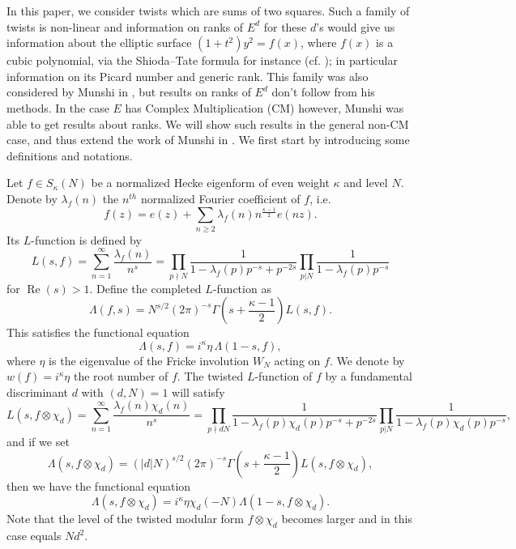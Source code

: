 \documentclass[12pt]{amsart}
\def\Re{\operatorname{Re}}
\begin{document}
In this paper, we consider twists which are sums of two squares. Such a family of twists is non-linear and information on ranks of $E^d$ for these $d$'s would give us information about the elliptic surface $(1+t^2)y^2=f(x)$, where $f(x)$ is a cubic polynomial, via the Shioda--Tate formula for instance (cf. \cite{shioda}); in particular information on its Picard number and generic rank. This family was also considered by Munshi in \cite{Munshi1}, but results on ranks of $E^d$ don't follow from his methods. In the case $E$ has Complex Multiplication (CM) however, Munshi \cite{Munshi2} was able to get results about ranks. We will show such results in the general non-CM case, and thus extend the work of Munshi in \cite{Munshi1}. We first start by introducing some definitions and notations.

Let $f \in S_{\kappa}(N) $ be a normalized Hecke eigenform of even weight $\kappa$ and level $N$. Denote by $\lambda_f(n)$ the $n^{th}$ normalized Fourier coefficient of $f$, i.e. $$f(z)=e(z)+\sum_{n\geq 2}\lambda_f(n)n^{\frac{\kappa-1}{2}}e(nz).$$ Its $L$-function is defined by
\[L(s,f)=\sum_{n=1}^{\infty}\frac{\lambda_f(n)}{n^s}=\prod_{p\nmid N}\frac{1}{1-\lambda_f(p)p^{-s}+p^{-2s}}\prod_{p|N}\frac{1}{1-\lambda_f(p)p^{-s}}\]
for $\Re(s)>1$.
Define the completed $L$-function as
\[\Lambda(f,s)=N^{s/2}(2\pi)^{-s}\Gamma\left(s+\frac{\kappa-1}{2}\right)L(s,f).\]
This satisfies the functional equation
\[\Lambda(s,f)=i^{\kappa}\eta\,\Lambda(1-s,f),\]
where $\eta$ is the eigenvalue of the Fricke involution $W_N$ acting on $f$. We denote by $w(f)=i^{\kappa}\eta$ the root number of $f$.
The twisted $L$-function of $f$ by a fundamental discriminant $d$ with $(d,N)=1$ will satisfy
\[L(s,f\otimes\chi_d)=\sum_{n=1}^{\infty}\frac{\lambda_f(n)\chi_d(n)}{n^s}=\prod_{p\nmid dN}\frac{1}{1-\lambda_f(p)\chi_d(p)p^{-s}+p^{-2s}}\prod_{p|N}\frac{1}{1-\lambda_f(p)\chi_d(p)p^{-s}},\]
and if we set 
\[\Lambda(s,f\otimes\chi_d)=(|d|N)^{s/2}(2\pi)^{-s}\Gamma\left(s+\frac{\kappa-1}{2}\right)L(s,f\otimes \chi_d),\]
then we have the functional equation
\[\Lambda(s,f\otimes\chi_d)=i^{\kappa}\eta \chi_d(-N)\Lambda(1-s,f\otimes\chi_d).\]
Note that the level of the twisted modular form $f\otimes \chi_d$ becomes larger and in this case equals $Nd^2$.
\end{document}
